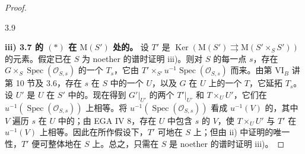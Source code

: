 \begin{proof}
\begin{SGAresult}{}{3.9}
\end{SGAresult}
\textbf{iii) 3.7 的 $(*)$ 在 $\mathrm M(S')$ 处的。}
设 $T'$ 是 $\operatorname{Ker}(\mathrm M(S')\rightrightarrows\mathrm M(S'\times_S S'))$ 的元素。假定已在 $S$ 为 noether 的谱时证明 iii)。则对 $S$ 的每一点 $s$，存在 $G\times_S\operatorname{Spec}(\mathcal O_{S,s})$ 的一个 $T_s$，它由 $T'\times_{S'}u^{-1}\operatorname{Spec}(\mathcal O_{S,s})$ 而来。由第 VI$_B$ 讲第 10 节及 3.6，存在 $s$ 在 $S$ 中的一个 $U$，以及 $G$ 在 $U$ 上的一个 $T$，它延拓 $T_s$。设 $U'$ 是 $U$ 在 $S'$ 中的。现在得到 $G'|_{U'}$ 的两个 $T'|_{U'}$ 和 $T\times_U U'$，它们在 $u^{-1}(\operatorname{Spec}(\mathcal O_{S,s}))$ 上相等。将 $u^{-1}(\operatorname{Spec}(\mathcal O_{S,s}))$ 看成  $u^{-1}(V)$ 的，其中 $V$ 遍历 $s$ 在 $U$ 中的；由 EGA IV 8，存在 $U$ 中包含 $s$ 的 $V$，使 $T\times_U U'$ 与 $T'$ 在 $u^{-1}(V)$ 上相等。因此在所作假设下，$T'$ 可地在 $S$ 上；但由 ii) 中证明的唯一性，$T'$ 便可整体地在 $S$ 上。总之，只需在 $S$ 是 noether 的谱时证明 iii)。


\end{proof}
